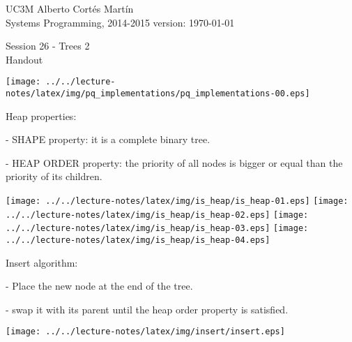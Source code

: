 \documentclass[a4paper, 10pt]{article}
\newcommand{\realtitle}{Session 26 - Trees 2}
\begin{document}
\footnotesize{
\makebox[\linewidth]{\rule{\textwidth}{0.4pt}}
UC3M \hfill Alberto Cortés Martín\\
Systems Programming, 2014-2015 \hfill version: \today\\
\makebox[\linewidth]{\rule{\textwidth}{0.4pt}}
\begin{center}
  \small{\realtitle}\\Handout
\end{center}
\makebox[\linewidth]{\rule{\textwidth}{0.4pt}}
}
\vspace{0.2cm}



\begin{center}
  \texttt{[image: ../../lecture-notes/latex/img/pq\_implementations/pq\_implementations-00.eps]}
\end{center}

\begin{blackboard}
Heap properties:

  - SHAPE property: it is a complete binary tree.

  - HEAP ORDER property: the priority of all nodes is bigger or equal than the priority of its children.
\end{blackboard}

\begin{center}
  \texttt{[image: ../../lecture-notes/latex/img/is\_heap/is\_heap-01.eps]}
  \texttt{[image: ../../lecture-notes/latex/img/is\_heap/is\_heap-02.eps]}
  \texttt{[image: ../../lecture-notes/latex/img/is\_heap/is\_heap-03.eps]}
  \texttt{[image: ../../lecture-notes/latex/img/is\_heap/is\_heap-04.eps]}
\end{center}

\newpage

\begin{multicols}{2}
\begin{blackboard}
Insert algorithm:

  - Place the new node at the end of the tree.

  - swap it with its parent until the heap
    order property is satisfied.
\end{blackboard}
\columnbreak
\begin{center}
  \texttt{[image: ../../lecture-notes/latex/img/insert/insert.eps]}
\end{center}
\end{multicols}
\end{document}
